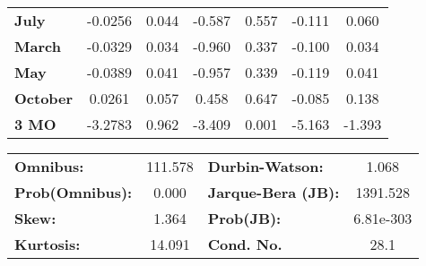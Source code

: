 \begin{center}
\begin{tabular}{lcccccc}
\textbf{July}     &      -0.0256  &        0.044     &    -0.587  &         0.557        &       -0.111    &        0.060     \\
\textbf{March}    &      -0.0329  &        0.034     &    -0.960  &         0.337        &       -0.100    &        0.034     \\
\textbf{May}      &      -0.0389  &        0.041     &    -0.957  &         0.339        &       -0.119    &        0.041     \\
\textbf{October}  &       0.0261  &        0.057     &     0.458  &         0.647        &       -0.085    &        0.138     \\
\textbf{3 MO}     &      -3.2783  &        0.962     &    -3.409  &         0.001        &       -5.163    &       -1.393     \\
\bottomrule
\end{tabular}
\begin{tabular}{lclc}
\textbf{Omnibus:}       & 111.578 & \textbf{  Durbin-Watson:     } &     1.068  \\
\textbf{Prob(Omnibus):} &   0.000 & \textbf{  Jarque-Bera (JB):  } &  1391.528  \\
\textbf{Skew:}          &   1.364 & \textbf{  Prob(JB):          } & 6.81e-303  \\
\textbf{Kurtosis:}      &  14.091 & \textbf{  Cond. No.          } &      28.1  \\
\bottomrule
\end{tabular}
\end{center}

